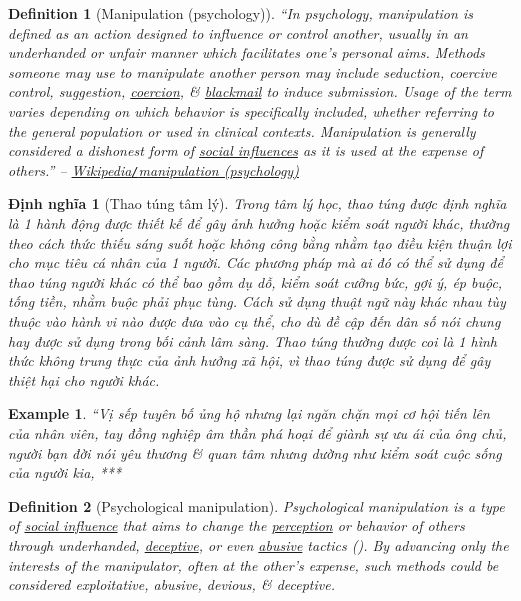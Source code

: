\documentclass[12pt]{article}
\newtheorem{definition}{Definition}[section]
\newtheorem{dinhnghia}{Định nghĩa}[section]
\newtheorem{example}{Example}
\begin{document}
\begin{definition}[Manipulation (psychology)]
	``In psychology, \emph{manipulation} is defined as an action designed to influence or control another, usually in an underhanded or unfair manner which facilitates one's personal aims. Methods someone may use to manipulate another person may include seduction, coercive control, suggestion, \href{https://en.wikipedia.org/wiki/Coercion}{coercion}, \& \href{https://en.wikipedia.org/wiki/Blackmail}{blackmail} to induce submission. Usage of the term varies depending on which behavior is specifically included, whether referring to the general population or used in clinical contexts. Manipulation is generally considered a dishonest form of \href{https://en.wikipedia.org/wiki/Social_influence}{social influences} as it is used at the expense of others.'' -- \href{https://en.wikipedia.org/wiki/Manipulation_(psychology)}{Wikipedia{\tt/}manipulation (psychology)}
\end{definition}

\begin{dinhnghia}[Thao túng tâm lý]
	Trong tâm lý học, \emph{thao túng} được định nghĩa là 1 hành động được thiết kế để gây ảnh hưởng hoặc kiểm soát người khác, thường theo cách thức thiếu sáng suốt hoặc không công bằng nhằm tạo điều kiện thuận lợi cho mục tiêu cá nhân của 1 người. Các phương pháp mà ai đó có thể sử dụng để thao túng người khác có thể bao gồm dụ dỗ, kiểm soát cưỡng bức, gợi ý, ép buộc, tống tiền, nhằm buộc phải phục tùng. Cách sử dụng thuật ngữ này khác nhau tùy thuộc vào hành vi nào được đưa vào cụ thể, cho dù đề cập đến dân số nói chung hay được sử dụng trong bối cảnh lâm sàng. Thao túng thường được coi là 1 hình thức không trung thực của ảnh hưởng xã hội, vì thao túng được sử dụng để gây thiệt hại cho người khác.
\end{dinhnghia}

\begin{example}
	``Vị sếp tuyên bố ủng hộ nhưng lại ngăn chặn mọi cơ hội tiến lên của nhân viên, tay đồng nghiệp âm thần phá hoại để giành sự ưu ái của ông chủ, người bạn đời nói yêu thương \& quan tâm nhưng dường như kiểm soát cuộc sống của người kia, ***
\end{example}

\begin{definition}[Psychological manipulation]
	\emph{Psychological manipulation} is a type of \href{https://psychology.wikia.org/wiki/Social_influence}{social influence} that aims to change the \href{https://en.wikipedia.org/wiki/Perception}{perception} or behavior of others through underhanded, \href{https://en.wikipedia.org/wiki/Deceptive}{deceptive}, or even \href{https://psychology.wikia.org/wiki/Abuse}{abusive} tactics (\cite{Braiker_string}). By advancing only the interests of the manipulator, often at the other's expense, such methods could be considered exploitative, abusive, devious, \& deceptive.
\end{definition}
\end{document}
